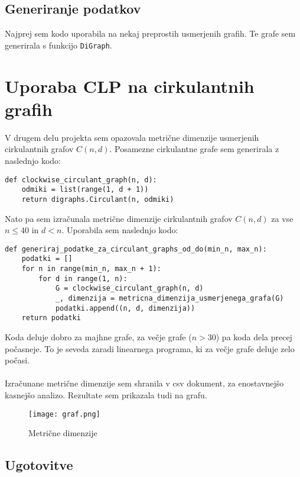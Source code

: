 \documentclass[a4paper,12pt]{article}
\theoremstyle{definition}
\theoremstyle{remark}
\theoremstyle{definition}
\begin{document}
\subsection*{Generiranje podatkov}
Najprej sem kodo uporabila na nekaj preprostih usmerjenih grafih. Te grafe sem generirala s funkcijo \texttt{DiGraph}.

\section*{Uporaba CLP na cirkulantnih grafih}
V drugem delu projekta sem opazovala metrične dimenzije usmerjenih cirkulantnih grafov  \( C(n, d) \). 
Posamezne cirkulantne grafe sem generirala z naslednjo kodo: 
\noindent
\begin{lstlisting}
def clockwise_circulant_graph(n, d):
    odmiki = list(range(1, d + 1)) 
    return digraphs.Circulant(n, odmiki)
    \end{lstlisting}

\noindent    
Nato pa sem izračunala metrične dimenzije cirkulantnih grafov $C(n,d)$ za vse $n \leq  40$ in $d < n$.
Uporabila sem naslednjo kodo:

\begin{lstlisting}
def generiraj_podatke_za_circulant_graphs_od_do(min_n, max_n):
    podatki = []  
    for n in range(min_n, max_n + 1):  
        for d in range(1, n):  
            G = clockwise_circulant_graph(n, d) 
            _, dimenzija = metricna_dimenzija_usmerjenega_grafa(G)  
            podatki.append((n, d, dimenzija))  
    return podatki

\end{lstlisting}

\noindent
Koda deluje dobro za majhne grafe, za večje grafe ($n > 30$) pa koda dela precej počasneje. 
To je seveda zaradi linearnega programa, ki za večje grafe deluje zelo počasi.
\\
\\
Izračunane metrične dimenzije sem shranila v csv dokument, za enostavnejšo kasnejšo analizo. 
Rezultate sem prikazala tudi na grafu.

\begin{figure}[H]  
    \centering
    \texttt{[image: graf.png]}  
    \caption{Metrične dimenzije} 
    \label{fig:screenshot}  
\end{figure}

\subsection*{Ugotovitve}
\end{document}
